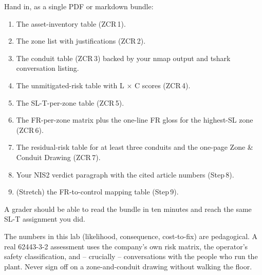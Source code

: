 \documentclass[11pt,a4paper]{article}
\begin{document}
\begin{deliverbox}
Hand in, as a single PDF or markdown bundle:
\begin{enumerate}\setlength{\itemsep}{1pt}
  \item The asset-inventory table (ZCR\,1).
  \item The zone list with justifications (ZCR\,2).
  \item The conduit table (ZCR\,3) backed by your nmap output and tshark conversation listing.
  \item The unmitigated-risk table with L $\times$ C scores (ZCR\,4).
  \item The SL-T-per-zone table (ZCR\,5).
  \item The FR-per-zone matrix plus the one-line FR gloss for the highest-SL zone (ZCR\,6).
  \item The residual-risk table for at least three conduits and the one-page Zone \& Conduit Drawing (ZCR\,7).
  \item Your NIS2 verdict paragraph with the cited article numbers (Step\,8).
  \item (Stretch) the FR-to-control mapping table (Step\,9).
\end{enumerate}
A grader should be able to read the bundle in ten minutes and reach the same SL-T assignment you did.
\end{deliverbox}

\begin{warnbox}
The numbers in this lab (likelihood, consequence, cost-to-fix) are pedagogical. A real 62443-3-2 assessment uses the company's own risk matrix, the operator's safety classification, and -- crucially -- conversations with the people who run the plant. Never sign off on a zone-and-conduit drawing without walking the floor.
\end{warnbox}
\end{document}
